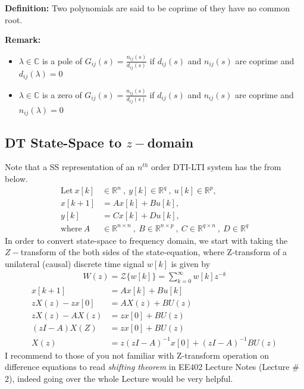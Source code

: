 \documentclass[twoside]{article}
\begin{document}
\vspace{3pt}

\textbf{Definition:} Two polynomials are said to be coprime of they
have no common root. 

\textbf{Remark:} 
\vspace{-6pt}
\begin{itemize}
\item $\lambda \in \mathbb{C}$ is a pole of $G_{ij}(s) =
  \frac{n_{ij}(s)}{d_{ij}(s)}$ if $d_{ij}(s)$ and $n_{ij}(s)$ are
  coprime and $d_{ij}(\lambda)=0$
\\
\item $\lambda \in \mathbb{C}$ is a zero of $G_{ij}(s) =
  \frac{n_{ij}(s)}{d_{ij}(s)}$ if $d_{ij}(s)$ and $n_{ij}(s)$ are
  coprime and $n_{ij}(\lambda)=0$
\
\end{itemize}

\subsection{DT State-Space to $z-$domain}

Note that a SS representation of an $n^{th}$ order DTI-LTI system has the from below.
%
\begin{align*}
  \mathrm{Let} \ x[k] &\in \mathbb{R}^n \ , \ y[k] \in \mathbb{R}^q \ ,\  u[k] \in
  \mathbb{R}^p , \\
  x[k+1] &= A x[k] + B u[k] , \\
  y[k] &= C x[k] + D u[k] , \\
  \mathrm{where} \ A &\in \mathbb{R}^{n \times n} \ , \ 
    B \in \mathbb{R}^{n \times p} \ ,\  C \in \mathbb{R}^{q \times n} \ , \ D \in \mathbb{R}^q
\end{align*}
%
In order to convert state-space to frequency domain, we start with taking the $Z-$transform of the 
both sides of the state-equation, where Z-transform of a unilateral (causal) discrete time signal $w[k]$ is given by 
%
\begin{align*}
  W(z) = \mathcal{Z} \lbrace w[k] \rbrace = \sum\limits_{k=0}^{\infty} w[k] z^{-k} 
\end{align*}
%
\begin{align*}
x[k+1] &= A x[k] + B u[k]
\\
z X(z) - z x[0] &= A X(z) + B U(z)
\\
z X(z) - A X(z) &= z x[0] +  B U(z)
\\
\left( z I - A \right) X(Z) &=  z x[0] +  B U(z)
\\
X(z) &= z \left( z I - A \right)^{-1} x[0] + \left( z I - A \right)^{-1} B U(z)
\end{align*}
%
I recommend to those of you not familiar with Z-transform operation on
difference equations to read \textit{shifting theorem} in EE402 Lecture Notes (Lecture
\# 2), indeed going over the whole Lecture would be very helpful. 
\end{document}
